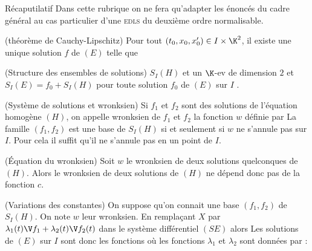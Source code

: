 \begin{genthm}{Récaputilatif}
Dans cette rubrique on ne fera qu'adapter les énoncés du cadre général au cas particulier d'une \textsc{edls} du deuxième ordre normalisable.


\unite(théorème de Cauchy-Lipschitz)
Pour tout $(t_0,x_0,x_0')\in I\times \K^2$, il existe une unique solution $f$ de $(E)$ telle que

\unite(Structure des ensembles de solutions)
$S_I(H)$ et un $\K$-ev de dimension $2$ et $S_I(E)=f_0+S_I(H)$ pour toute solution $f_0$ de $(E)$ sur $I$ .

\unite(Système de solutions et wronksien)
Si $f_1$ et $f_2$ sont des solutions de l'équation homogène $(H)$, on appelle wronksien de $f_1$ et $f_2$ la fonction $w$ définie par
La famille $(f_1,f_2)$ est une base de $S_I(H)$ si et seulement si $w$ ne s'annule pas sur $I$. Pour cela il suffit qu'il ne s'annule pas en un point de $I$.

\unite(Équation du wronksien)
Soit $w$ le wronksien de deux solutions quelconques de $(H)$. Alors
\nb le wronksien de deux solutions de $(H)$ ne dépend donc pas de la fonction $c$.
\endnb

\unite(Variations des constantes)
On suppose qu'on connait une base $(f_1,f_2)$ de $S_I(H)$. On note $w$ leur wronksien. En remplaçant $X$ par
$\lambda_1(t)\V f_1+\lambda_2(t)\V f_2(t)$ dans le système différentiel $(SE)$ alors
Les solutions de $(E)$ sur $I$ sont donc les fonctions
où les fonctions $\lambda_1$ et $\lambda_2$ sont données par :
\end{genthm}

